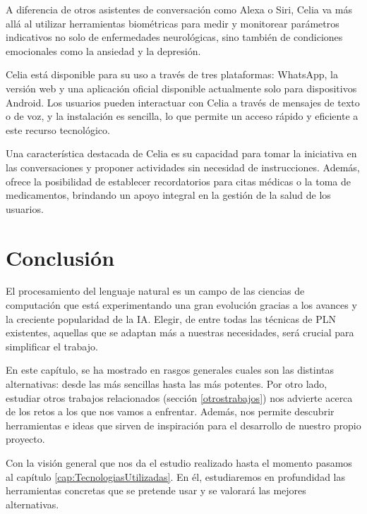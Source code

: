 A diferencia de otros asistentes de conversación como Alexa o Siri, Celia va más allá al utilizar herramientas biométricas para medir y monitorear parámetros indicativos no solo de enfermedades neurológicas, sino también de condiciones emocionales como la ansiedad y la depresión.

Celia está disponible para su uso a través de tres plataformas: WhatsApp, la versión web y una aplicación oficial disponible actualmente solo para dispositivos Android. Los usuarios pueden interactuar con Celia a través de mensajes de texto o de voz, y la instalación es sencilla, lo que permite un acceso rápido y eficiente a este recurso tecnológico.

Una característica destacada de Celia es su capacidad para tomar la iniciativa en las conversaciones y proponer actividades sin necesidad de instrucciones. Además, ofrece la posibilidad de establecer recordatorios para citas médicas o la toma de medicamentos, brindando un apoyo integral en la gestión de la salud de los usuarios.
\section{Conclusión}
El procesamiento del lenguaje natural es un campo de las ciencias de computación que está experimentando una gran evolución gracias a los avances y la creciente popularidad de la IA. Elegir, de entre todas las técnicas de PLN existentes, aquellas que se adaptan más a nuestras necesidades, será crucial para simplificar el trabajo. 

En este capítulo, se ha mostrado en rasgos generales cuales son las distintas alternativas: desde las más sencillas hasta las más potentes. Por otro lado, estudiar otros trabajos relacionados (sección \ref{otrostrabajos}) nos advierte acerca de los retos a los que nos vamos a enfrentar. Además, nos permite descubrir herramientas e ideas que sirven de inspiración para el desarrollo de nuestro propio proyecto. 

Con la visión general que nos da el estudio realizado hasta el momento pasamos al capítulo \ref{cap:TecnologiasUtilizadas}. En él, estudiaremos en profundidad las herramientas concretas que se pretende usar y se valorará las mejores alternativas.
